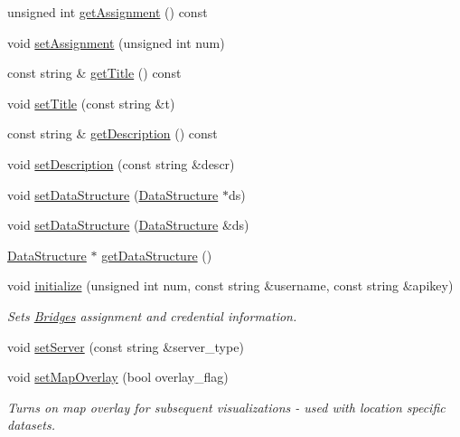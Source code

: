 \begin{DoxyCompactItemize}
unsigned int \hyperlink{classbridges_1_1_bridges_aa45b4ba781b5cbecc8cb04c76dfd527a}{get\+Assignment} () const
\item 
void \hyperlink{classbridges_1_1_bridges_aca7a68fb8cc0d1bec81656dfa77b1162}{set\+Assignment} (unsigned int num)
\item 
const string \& \hyperlink{classbridges_1_1_bridges_a8fe8c79b0f852c0049a699c801e40a61}{get\+Title} () const
\item 
void \hyperlink{classbridges_1_1_bridges_ac9f2e0b5fd5c70053db233dcbb636b56}{set\+Title} (const string \&t)
\item 
const string \& \hyperlink{classbridges_1_1_bridges_ae9f238e1d9fc421c6c08aacb74e0ef6c}{get\+Description} () const
\item 
void \hyperlink{classbridges_1_1_bridges_aa26285a4d04c2759113dcf233406a8da}{set\+Description} (const string \&descr)
\item 
void \hyperlink{classbridges_1_1_bridges_a7447e2d5808c492d26132690c1a639a7}{set\+Data\+Structure} (\hyperlink{classbridges_1_1datastructure_1_1_data_structure}{Data\+Structure} $\ast$ds)
\item 
void \hyperlink{classbridges_1_1_bridges_a40c30470565f76310b5a8aea80dcab3c}{set\+Data\+Structure} (\hyperlink{classbridges_1_1datastructure_1_1_data_structure}{Data\+Structure} \&ds)
\item 
\hyperlink{classbridges_1_1datastructure_1_1_data_structure}{Data\+Structure} $\ast$ \hyperlink{classbridges_1_1_bridges_a5ddfb17c2fb2d3ca89e7564677251dea}{get\+Data\+Structure} ()
\item 
void \hyperlink{classbridges_1_1_bridges_a507ee9983331d23829cfc60fd13ead78}{initialize} (unsigned int num, const string \&username, const string \&apikey)
\begin{DoxyCompactList}\small\item\em Sets \hyperlink{classbridges_1_1_bridges}{Bridges} assignment and credential information. \end{DoxyCompactList}\item 
void \hyperlink{classbridges_1_1_bridges_afa05302cf91c91b902aef693525107a5}{set\+Server} (const string \&server\+\_\+type)
\item 
void \hyperlink{classbridges_1_1_bridges_a221442c674b625a403486076cf8a7c03}{set\+Map\+Overlay} (bool overlay\+\_\+flag)
\begin{DoxyCompactList}\small\item\em Turns on map overlay for subsequent visualizations -\/ used with location specific datasets. \end{DoxyCompactList}\item 

\end{DoxyCompactItemize}
